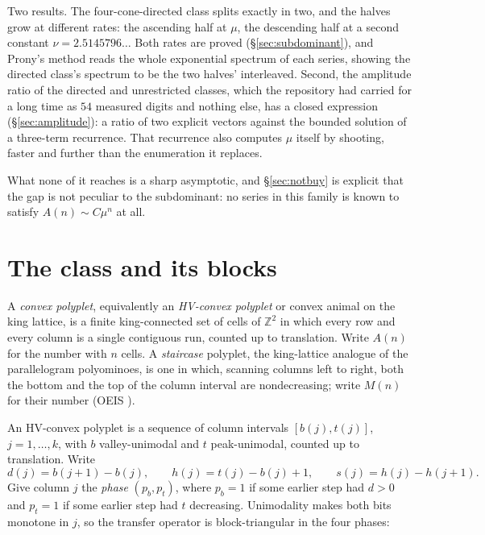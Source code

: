 \documentclass[11pt]{article}
\newcommand{\Z}{\mathbb{Z}}
\begin{document}
Two results. The four-cone-directed class splits exactly in two, and the halves
grow at different rates: the ascending half at $\mu$, the descending half at a
second constant $\nu = 2.5145796\dots$ Both rates are proved
(\S\ref{sec:subdominant}), and Prony's method reads the whole exponential
spectrum of each series, showing the directed class's spectrum to be the two
halves' interleaved. Second, the amplitude ratio of the directed and
unrestricted classes, which the repository had carried for a long time as $54$
measured digits and nothing else, has a closed expression
(\S\ref{sec:amplitude}): a ratio of two explicit vectors against the bounded
solution of a three-term recurrence. That recurrence also computes $\mu$ itself
by shooting, faster and further than the enumeration it replaces.

What none of it reaches is a sharp asymptotic, and \S\ref{sec:notbuy} is
explicit that the gap is not peculiar to the subdominant: no series in this
family is known to satisfy $A(n) \sim C\mu^n$ at all.

\section{The class and its blocks}
\label{sec:setup}

\begin{definition}
A \emph{convex polyplet}, equivalently an \emph{HV-convex polyplet} or convex
animal on the king lattice, is a finite king-connected set of cells of $\Z^2$ in
which every row and every column is a single contiguous run, counted up to
translation. Write $A(n)$ for the number with $n$ cells. A \emph{staircase}
polyplet, the king-lattice analogue of the parallelogram polyominoes, is
one in which, scanning columns left to right, both the bottom and the top of
the column interval are nondecreasing; write $M(n)$ for their number
(OEIS ).
\end{definition}

An HV-convex polyplet is a sequence of column intervals $[b(j), t(j)]$,
$j = 1,\dots,k$, with $b$ valley-unimodal and $t$ peak-unimodal, counted up to
translation. Write
\[
  d(j) = b(j{+}1) - b(j), \qquad h(j) = t(j) - b(j) + 1, \qquad
  s(j) = h(j) - h(j{+}1).
\]
Give column $j$ the \emph{phase} $(p_b, p_t)$, where $p_b = 1$ if some earlier
step had $d > 0$ and $p_t = 1$ if some earlier step had $t$ decreasing.
Unimodality makes both bits monotone in $j$, so the transfer operator is
block-triangular in the four phases:
\end{document}
